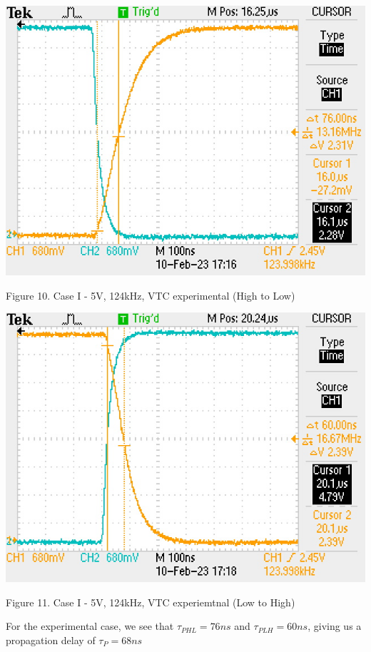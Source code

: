 \documentclass[conference]{IEEEtran}
\begin{document}
\begin{center}
    \centerline{\includegraphics[scale = 0.9]{figures/case1_HL_experimental.JPG}}
    Figure 10. Case I - 5V, 124kHz, VTC experimental (High to Low)
\end{center} 

\begin{center}
    \centerline{\includegraphics[scale = 0.9]{figures/case1_LH_experimental.JPG}}
    Figure 11. Case I - 5V, 124kHz, VTC experiemtnal (Low to High)
\end{center} 

For the experimental case, we see that $\tau_{PHL} = 76ns$ and 
$\tau_{PLH} = 60ns$, giving us a propagation delay of $\tau_P = 68ns$
\end{document}
